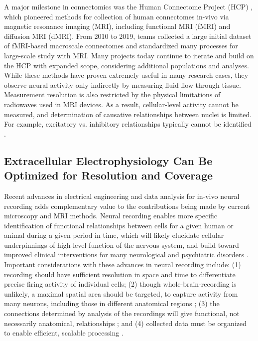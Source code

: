 \documentclass[11pt]{article}
\newcommand{\subsectionwithindent}[1]{
    \subsection*{#1}
    \hspace{\parindent} %
}
\begin{document}
A major milestone in connectomics was the Human Connectome Project (HCP) \cite{elam2021hcp}, which pioneered methods for collection of human connectomes in-vivo via magnetic resonance imaging (MRI), including functional MRI (fMRI) and diffusion MRI (dMRI). From 2010 to 2019, teams collected a large initial dataset of fMRI-based macroscale connectomes and standardized many processes for large-scale study with MRI. Many projects today continue to iterate and build on the HCP with expanded scope, considering additional populations and analyses. While these methods have proven extremely useful in many research cases, they observe neural activity only indirectly by measuring fluid flow through tissue. Measurement resolution is also restricted by the physical limitations of radiowaves used in MRI devices. As a result, cellular-level activity cannot be measured, and determination of causative relationships between nuclei is limited. For example, excitatory vs. inhibitory relationships typically cannot be identified \cite{hagman2010mriconnectomics}.

\subsectionwithindent{Extracellular Electrophysiology Can Be Optimized for Resolution and Coverage}
Recent advances in electrical engineering and data analysis for in-vivo neural recording adds complementary value to the contributions being made by current microscopy and MRI methods. Neural recording enables more specific identification of functional relationships between cells for a given human or animal during a given period in time, which will likely elucidate cellular underpinnings of high-level function of the nervous system, and build toward improved clinical interventions for many neurological and psychiatric disorders \cite{kobayashi2025connections, zhang2025neds,musk2019integrated, card2024neuroprosthesis}. Important considerations with these advances in neural recording include: (1) recording should have sufficient resolution in space and time to differentiate precise firing activity of individual cells; (2) though whole-brain-recording is unlikely, a maximal spatial area should be targeted, to capture activity from many neurons, including those in different anatomical regions \cite{jun2017probes}; (3) the connections determined by analysis of the recordings will give functional, not necessarily anatomical, relationships \cite{ciarrusta2023connectome}; and (4) collected data must be organized to enable efficient, scalable processing \cite{pachitariu2016kilosort, buccino2020spikeinterface}.
\end{document}
